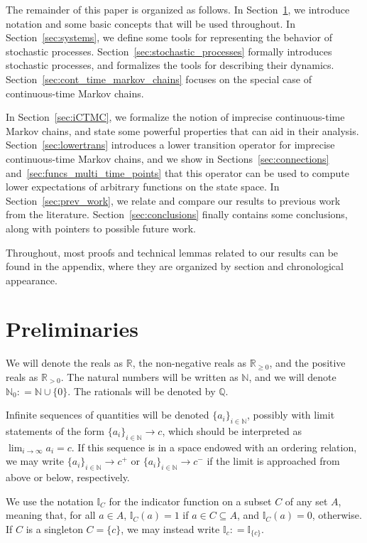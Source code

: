 \documentclass[10pt,a4paper]{paper}
\theoremstyle{definition}
\newcommand{\nats}{\mathbb{N}}
\newcommand{\reals}{\mathbb{R}}
\newcommand{\realspos}{\reals_{>0}}
\newcommand{\realsnonneg}{\reals_{\geq 0}}
\newcommand{\ind}[1]{\mathbb{I}_{#1}}
\newcommand{\coloneqq}{:\!=}
\begin{document}
The remainder of this paper is organized as follows. In Section~\ref{sec:prelim}, we introduce notation and some basic concepts that will be used throughout. In Section~\ref{sec:systems}, we define some tools for representing the behavior of stochastic processes. Section~\ref{sec:stochastic_processes} formally introduces stochastic processes, and formalizes the tools for describing their dynamics. Section~\ref{sec:cont_time_markov_chains} focuses on the special case of continuous-time Markov chains. 

In Section~\ref{sec:iCTMC}, we formalize the notion of imprecise continuous-time Markov chains, and state some powerful properties that can aid in their analysis. Section~\ref{sec:lowertrans} introduces a lower transition operator for imprecise continuous-time Markov chains, and we show in Sections~\ref{sec:connections} and~\ref{sec:funcs_multi_time_points} that this operator can be used to compute lower expectations of arbitrary functions on the state space. In Section~\ref{sec:prev_work}, we relate and compare our results to previous work from the literature. Section~\ref{sec:conclusions} finally contains some conclusions, along with pointers to possible future work.

Throughout, most proofs and technical lemmas related to our results can be found in the appendix, where they are organized by section and chronological appearance.

\section{Preliminaries}\label{sec:prelim}

We will denote the reals as $\reals$, the non-negative reals as $\realsnonneg$, and the positive reals as $\realspos$. The natural numbers will be written as $\nats$, and we will denote $\nats_0\coloneqq\nats\cup\{0\}$. The rationals will be denoted by $\mathbb{Q}$.

Infinite sequences of quantities will be denoted $\{a_i\}_{i\in\nats}$, possibly with limit statements of the form $\{a_i\}_{i\in\nats}\to c$, which should be interpreted as $\lim_{i\to\infty}a_i=c$. If this sequence is in a space endowed with an ordering relation, we may write $\{a_i\}_{i\in\nats}\to c^+$ or $\{a_i\}_{i\in\nats}\to c^-$ if the limit is approached from above or below, respectively.

We use the notation $\ind{C}$ for the indicator function on a subset $C$ of any set $A$, meaning that, for all $a\in A$, $\ind{C}(a)=1$ if $a\in C\subseteq A$, and $\ind{C}(a)=0$, otherwise. If $C$ is a singleton $C=\{c\}$, we may instead write $\ind{c}\coloneqq\ind{\{c\}}$.
\end{document}
